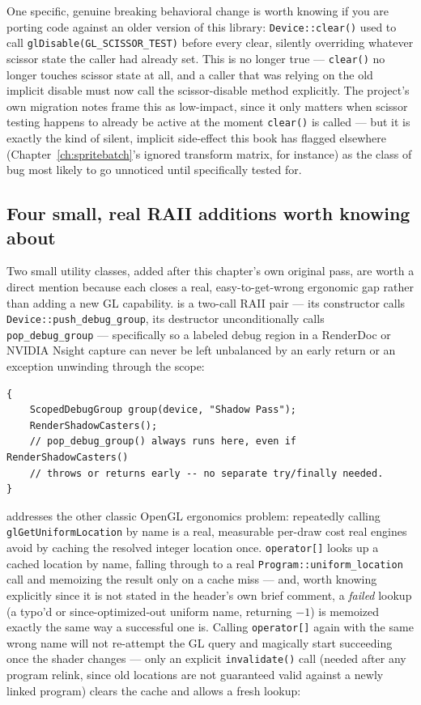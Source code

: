 One specific, genuine breaking behavioral change is worth knowing if you are porting code
against an older version of this library: \texttt{Device::clear()} used to call
\texttt{glDisable(GL\_SCISSOR\_TEST)} before every clear, silently overriding whatever scissor
state the caller had already set. This is no longer true --- \texttt{clear()} no longer
touches scissor state at all, and a caller that was relying on the old implicit disable must
now call the scissor-disable method explicitly. The project's own migration notes frame this
as low-impact, since it only matters when scissor testing happens to already be active at the
moment \texttt{clear()} is called --- but it is exactly the kind of silent, implicit
side-effect this book has flagged elsewhere (Chapter~\ref{ch:spritebatch}'s ignored transform
matrix, for instance) as the class of bug most likely to go unnoticed until specifically
tested for.

\subsection{Four small, real RAII additions worth knowing about}

Two small utility classes, added after this chapter's own original pass, are worth a direct
mention because each closes a real, easy-to-get-wrong ergonomic gap rather than adding a new
GL capability.  is a two-call RAII pair --- its constructor calls
\texttt{Device::push\_debug\_group}, its destructor unconditionally calls
\texttt{pop\_debug\_group} --- specifically so a labeled debug region in a RenderDoc or NVIDIA
Nsight capture can never be left unbalanced by an early return or an exception unwinding
through the scope:

\begin{lstlisting}
{
    ScopedDebugGroup group(device, "Shadow Pass");
    RenderShadowCasters();
    // pop_debug_group() always runs here, even if RenderShadowCasters()
    // throws or returns early -- no separate try/finally needed.
}
\end{lstlisting}

 addresses the other classic OpenGL ergonomics problem: repeatedly
calling \texttt{glGetUniformLocation} by name is a real, measurable per-draw cost real engines
avoid by caching the resolved integer location once. \texttt{operator[]} looks up a cached
location by name, falling through to a real \texttt{Program::uniform\_location} call and
memoizing the result only on a cache miss --- and, worth knowing explicitly since it is not
stated in the header's own brief comment, a \emph{failed} lookup (a typo'd or since-optimized-out
uniform name, returning $-1$) is memoized exactly the same way a successful one is. Calling
\texttt{operator[]} again with the same wrong name will not re-attempt the GL query and
magically start succeeding once the shader changes --- only an explicit \texttt{invalidate()}
call (needed after any program relink, since old locations are not guaranteed valid against a
newly linked program) clears the cache and allows a fresh lookup:

